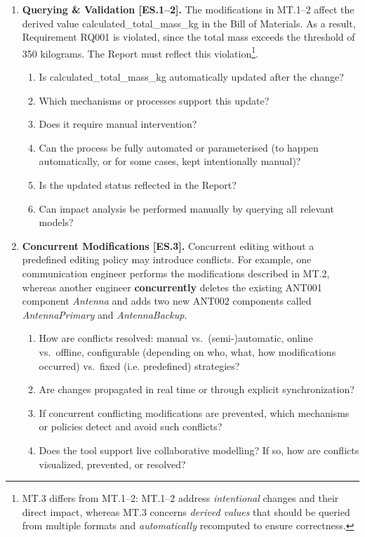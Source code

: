 \documentclass{article}
\begin{document}
\begin{enumerate}[label=\textbf{MT.\arabic*}, leftmargin=*]
   \item \textbf{Querying \& Validation [ES.1--2].}  
   The modifications in MT.1--2 affect the derived value
   \textsf{calculated\_total\_mass\_kg} in the Bill of Materials. As a result,
   Requirement \textsf{RQ001} is violated, since the total mass exceeds the
   threshold of \textsf{350 kilograms}. The Report must reflect this violation\footnote{MT.3
   differs from MT.1--2: MT.1--2 address \emph{intentional} changes and their direct impact, 
   whereas MT.3 concerns \emph{derived values} that should be queried from multiple formats and \emph{automatically}
   recomputed to ensure correctness.}.

   \begin{enumerate}[label=\textbf{\arabic*.}]
      \item Is \textsf{calculated\_total\_mass\_kg} automatically updated after the change?
      \item Which mechanisms or processes support this update?
      \item Does it require manual intervention?
      \item Can the process be fully automated or parameterised (to happen automatically,
      or for some cases, kept intentionally manual)?
      \item Is the updated status reflected in the Report?
      \item Can impact analysis be performed manually by querying all relevant models?
   \end{enumerate}
   
   \clearpage
   \item \textbf{Concurrent Modifications [ES.3].}  
   Concurrent editing without a predefined editing policy may introduce conflicts. For example, one communication engineer performs the modifications described in MT.2, whereas another engineer \textbf{concurrently} deletes the existing \textsf{ANT001} component \textit{Antenna} and adds two new \textsf{ANT002} components called \textit{AntennaPrimary} and \textit{AntennaBackup}. 

   \begin{enumerate}[label=\textbf{\arabic*.}]
      \item How are conflicts resolved: manual vs.\ (semi-)automatic, 
      online vs.\ offline, configurable (depending on who, what, how modifications
      occurred) vs.\ fixed (i.e. predefined) strategies?
      \item Are changes propagated in real time or through explicit synchronization?
      \item If concurrent conflicting modifications are prevented, which mechanisms 
      or policies detect and avoid such conflicts?
      \item Does the tool support live collaborative modelling? 
      If so, how are conflicts visualized, prevented, or resolved?
   \end{enumerate}


\end{enumerate}
\end{document}
